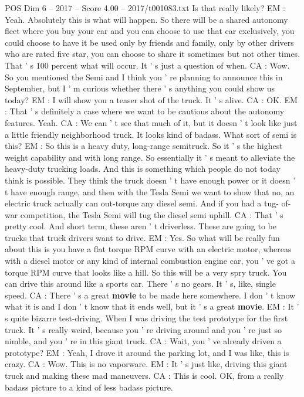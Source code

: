 \begin{textsample}{POS Dim 6 – 2017 – Score 4.00 – 2017/t001083.txt}
Is that really likely?
EM : Yeah.
Absolutely this is what will happen.
So there will be a shared autonomy fleet where you buy your car and you can choose to use that car exclusively, you could choose to have it be used only by friends and family, only by other drivers who are rated five star, you can choose to share it sometimes but not other times.
That ' s 100 percent what will occur.
It ' s just a question of when.
CA : Wow.
So you mentioned the Semi and I think you ' re planning to announce this in September, but I ' m curious whether there ' s anything you could show us today?
EM : I will show you a teaser shot of the truck.
It ' s alive.
CA : OK.
EM : That ' s definitely a case where we want to be cautious about the autonomy features.
Yeah.
CA : We can ' t see that much of it, but it doesn ' t look like just a little friendly neighborhood truck.
It looks kind of badass.
What sort of semi is this?
EM : So this is a heavy duty, long-range semitruck.
So it ' s the highest weight capability and with long range.
So essentially it ' s meant to alleviate the heavy-duty trucking loads.
And this is something which people do not today think is possible.
They think the truck doesn ' t have enough power or it doesn ' t have enough range, and then with the Tesla Semi we want to show that no, an electric truck actually can out-torque any diesel semi.
And if you had a tug- of-war competition, the Tesla Semi will tug the diesel semi uphill.
CA : That ' s pretty cool.
And short term, these aren ' t driverless.
These are going to be trucks that truck drivers want to drive.
EM : Yes.
So what will be really fun about this is you have a flat torque RPM curve with an electric motor, whereas with a diesel motor or any kind of internal combustion engine car, you ' ve got a torque RPM curve that looks like a hill.
So this will be a very spry truck.
You can drive this around like a sports car.
There ' s no gears.
It ' s, like, single speed.
CA : There ' s a great \textbf{movie} to be made here somewhere.
I don ' t know what it is and I don ' t know that it ends well, but it ' s a great \textbf{movie}.
EM : It ' s quite bizarre test-driving.
When I was driving the test prototype for the first truck.
It ' s really weird, because you ' re driving around and you ' re just so nimble, and you ' re in this giant truck.
CA : Wait, you ' ve already driven a prototype?
EM : Yeah, I drove it around the parking lot, and I was like, this is crazy.
CA : Wow.
This is no vaporware.
EM : It ' s just like, driving this giant truck and making these mad maneuvers.
CA : This is cool.
OK, from a really badass picture to a kind of less badass picture.

\end{textsample}
